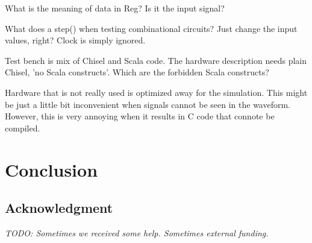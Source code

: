 \documentclass[a4paper, conference]{IEEEtran}
\newcommand{\todo}[1]{{\emph{TODO: #1}}}
\begin{document}
What is the meaning of data in Reg? Is it the input signal?

What does a step() when testing combinational circuits? Just change the input values, right? Clock is simply ignored.

Test bench is mix of Chisel and Scala code. The hardware description needs plain Chisel, 'no Scala constructs'. Which are the forbidden Scala constructs?

Hardware that is not really used is optimized away for the simulation.
This might be just a little bit inconvenient when signals cannot be seen in
the waveform. However, this is very annoying when it results in C code
that connote be compiled.

\section{Conclusion}
\label{sec:conclusion}


\subsection*{Acknowledgment}

\todo{Sometimes we received some help. Sometimes external funding.}




%


\end{document}
